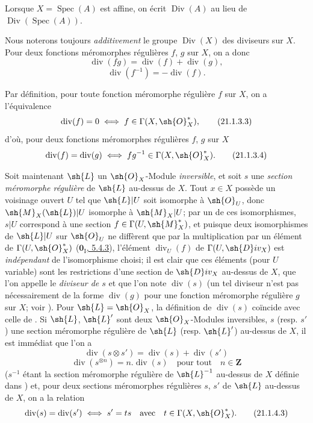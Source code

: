 Lorsque $X=\operatorname{Spec}(A)$ est affine, on écrit $\operatorname{Div}(A)$ au lieu de $\operatorname{Div}(\operatorname{Spec}(A))$.

\begin{env}[21.1.3]
\label{IV.21.1.3}
Nous noterons toujours \emph{additivement} le groupe $\operatorname{Div}(X)$ des diviseurs sur $X$.
Pour deux fonctions méromorphes régulières $f$, $g$ sur $X$, on a donc
\[
\label{IV.21.1.3.1}
  \operatorname{div}(fg)=\operatorname{div}(f)+\operatorname{div}(g),
  \tag{21.1.3.1}
\]
\[
\label{IV.21.1.3.2}
  \operatorname{div}(f^{-1})=-\operatorname{div}(f).
  \tag{21.1.3.2}
\]

Par définition, pour toute fonction méromorphe régulière $f$ sur $X$, on a l'équivalence
\[
\label{IV.21.1.3.3}
  \operatorname{div}(f)=0 \iff f\in\Gamma(X,\sh{O}_X^*),
  \tag{21.1.3.3}
\]
d'où, pour deux fonctions méromorphes régulières $f$, $g$ sur $X$
\[
\label{IV.21.1.3.4}
  \operatorname{div}(f)=\operatorname{div}(g) \iff fg^{-1}\in\Gamma(X,\sh{O}_X^*).
  \tag{21.1.3.4}
\]
\end{env}

\begin{env}[21.1.4]
Soit maintenant $\sh{L}$ un $\sh{O}_X$-Module \emph{inversible}, et soit $s$ une \emph{section méromorphe régulière}  de $\sh{L}$ au-dessus de $X$.
Tout $x\in X$ possède un voisinage ouvert $U$ tel que $\sh{L}|U$ soit isomorphe à $\sh{O}_U$, donc $\sh{M}_X(\sh{L})|U$ isomorphe à $\sh{M}_X|U$;
par un de ces isomorphismes, $s|U$ correspond à une section $f\in\Gamma(U,\sh{M}_X^*)$, et puisque deux isomorphismes de $\sh{L}|U$ sur $\sh{O}_U$ ne diffèrent que par la multiplication par un élément de $\Gamma(U,\sh{O}_X^*)$ (\hyperref[0.5.4.3]{$\mathbf{0}_{\mathrm I}$, 5.4.3}), l'élément $\operatorname{div}_U(f)$ de $\Gamma(U,\sh{D}iv_X)$ est \emph{indépendant} de l'isomorphisme choisi;
il est clair que ces éléments (pour $U$ variable) sont les restrictions d'une section de $\sh{D}iv_X$ au-dessus de $X$, que l'on appelle le \emph{diviseur de $s$} et que l'on note $\operatorname{div}(s)$ (un tel diviseur n'est pas nécessairement de la forme $\operatorname{div}(g)$ pour une fonction méromorphe régulière $g$ sur $X$; voir ).
Pour $\sh{L}=\sh{O}_X$, la définition de $\operatorname{div}(s)$ coïncide avec celle de .
Si $\sh{L}$, $\sh{L}'$ sont deux $\sh{O}_X$-Modules inversibles, $s$ (resp. $s'$) une section méromorphe régulière de $\sh{L}$ (resp. $\sh{L}'$) au-dessus de $X$, il est immédiat que l'on a
\[
\label{IV.21.1.4.1}
  \operatorname{div}(s\otimes s')=\operatorname{div}(s)+\operatorname{div}(s')
  \tag{21.1.4.1}
\]
\[
\label{IV.21.1.4.2}
  \operatorname{div}(s^{\otimes n})=n.\operatorname{div}(s) \quad\text{pour tout}\quad n\in\mathbf{Z}
  \tag{21.1.4.2}
\]
($s^{-1}$ étant la section méromorphe régulière de $\sh{L}^{-1}$ au-dessus de $X$ définie dans )
et, pour deux sections méromorphes régulières $s$, $s'$ de $\sh{L}$ au-dessus de $X$, on a la relation
\[
\label{IV.21.1.4.3}
  \operatorname{div}(s)=\operatorname{div}(s') \iff s'=ts \quad\text{avec}\quad t\in\Gamma(X,\sh{O}_X^*).
  \tag{21.1.4.3}
\]
\end{env}

